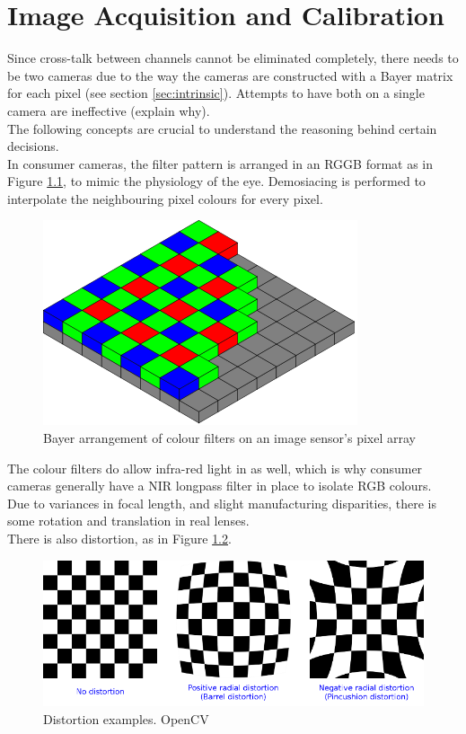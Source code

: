 \chapter{Image Acquisition and Calibration}

Since cross-talk between channels cannot be eliminated completely, there needs to be two cameras due to the way the cameras are constructed with a Bayer matrix for each pixel (see section \ref{sec:intrinsic}). Attempts to have both on a single camera are ineffective (explain why).\\

The following concepts are crucial to understand the reasoning behind certain decisions.\\

In consumer cameras, the filter pattern is arranged in an RGGB format as in Figure \ref{fig:bayer}, to mimic the physiology of the eye. Demosiacing is performed to interpolate the neighbouring pixel colours for every pixel.

\begin{figure}[H]
\centering
\includegraphics[scale=0.35]{images/bayer.png}
\caption{Bayer arrangement of colour filters on an image sensor's pixel array \cite{bayer}}
\label{fig:bayer}
\end{figure}

The colour filters do allow infra-red light in as well, which is why consumer cameras generally have a NIR longpass filter in place to isolate RGB colours.\\

Due to variances in focal length, and slight manufacturing disparities, there is some rotation and translation in real lenses.\\

There is also distortion, as in Figure \ref{fig:distortion_examples}.

\begin{figure}[H]
\centering
\includegraphics[scale=0.5]{images/distortion_examples.png}
\caption{Distortion examples. OpenCV \cite{calib3d}}
\label{fig:distortion_examples}
\end{figure}

